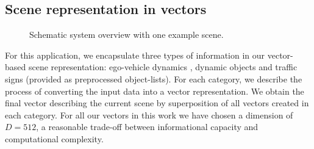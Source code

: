 \subsection{Scene representation in vectors}
\begin{figure}[t!]
	\centering
	\caption{Schematic system overview with one example scene.}\label{fig:sys}
\end{figure}
For this application, we encapsulate three types of information in our vector-based scene representation: ego-vehicle dynamics , dynamic objects and traffic signs (provided as preprocessed object-lists).
For each category, we describe the process of converting the input data into a vector representation. 
We obtain the final vector describing the current scene by superposition of all vectors created in each category. 
For all our vectors in this work we have chosen a dimension of $D=512$, a reasonable trade-off between informational capacity and computational complexity.\\
